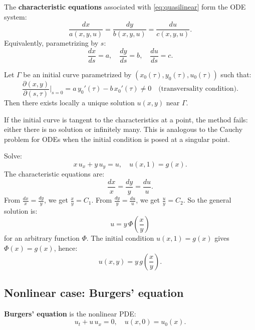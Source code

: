 \begin{definition}
The \textbf{characteristic equations} associated with
\eqref{eq:quasilinear} form the ODE system:
\begin{equation}\label{eq:char_system}
    \frac{dx}{a(x,y,u)} = \frac{dy}{b(x,y,u)} = \frac{du}{c(x,y,u)}.
\end{equation}
Equivalently, parametrizing by $s$:
\[
    \frac{dx}{ds} = a, \quad \frac{dy}{ds} = b, \quad \frac{du}{ds} = c.
\]
\end{definition}

\begin{theorem}
Let $\Gamma$ be an initial curve parametrized by
$(x_0(\tau), y_0(\tau), u_0(\tau))$ such that:
\[
    \frac{\partial(x,y)}{\partial(s,\tau)}\bigg|_{s=0}
    = a\, y_0'(\tau) - b\, x_0'(\tau) \neq 0
    \quad \text{(transversality condition)}.
\]
Then there exists locally a unique solution $u(x,y)$ near $\Gamma$.
\end{theorem}

\begin{warning}[title=\textbf{Transversality condition}]
If the initial curve is tangent to the characteristics at a point, the
method fails: either there is no solution or infinitely many. This is
analogous to the Cauchy problem for ODEs when the initial condition is
posed at a singular point.
\end{warning}

\begin{example}
Solve:
\[
    x\, u_x + y\, u_y = u, \quad u(x,1) = g(x).
\]
The characteristic equations are:
\[
    \frac{dx}{x} = \frac{dy}{y} = \frac{du}{u}.
\]
From $\frac{dx}{x} = \frac{dy}{y}$, we get $\frac{x}{y} = C_1$.
From $\frac{dy}{y} = \frac{du}{u}$, we get $\frac{u}{y} = C_2$.
So the general solution is:
\[
    u = y\, \Phi\!\left(\frac{x}{y}\right)
\]
for an arbitrary function $\Phi$. The initial condition $u(x,1) = g(x)$
gives $\Phi(x) = g(x)$, hence:
\[
    u(x,y) = y\, g\!\left(\frac{x}{y}\right).
\]
\end{example}

\subsection{Nonlinear case: Burgers' equation}

\begin{definition}
\textbf{Burgers' equation} is the nonlinear PDE:
\begin{equation}\label{eq:burgers}
    u_t + u\, u_x = 0, \quad u(x,0) = u_0(x).
\end{equation}
\end{definition}

